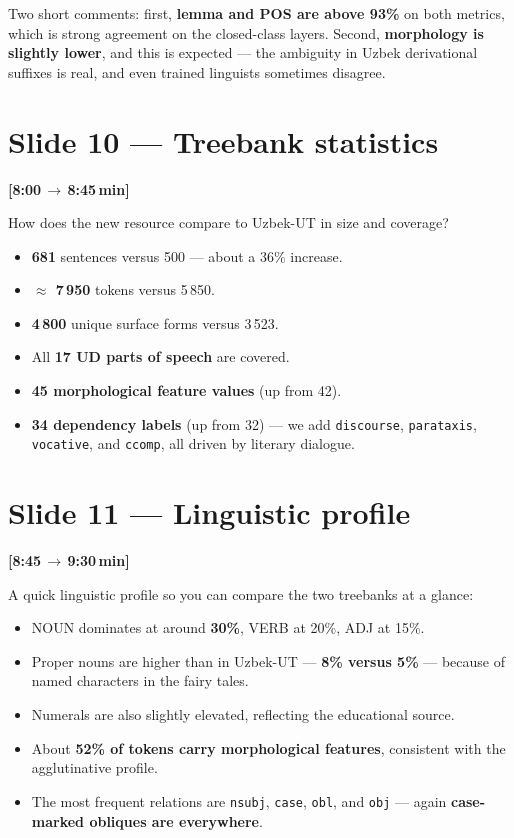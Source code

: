 \documentclass[12pt,a4paper]{article}
\newcommand{\timing}[2]{%
   \par\noindent\textbf{\small [#1\,$\to$\,#2\,min]}\par\vspace{0.2em}}
\newcommand{\say}[1]{\textbf{#1}}
\begin{document}
\noindent
Two short comments: first, \textbf{lemma and POS are above 93\%} on both
metrics, which is strong agreement on the closed-class layers. Second,
\textbf{morphology is slightly lower}, and this is expected — the
ambiguity in Uzbek derivational suffixes is real, and even trained
linguists sometimes disagree.

\section*{Slide 10 — Treebank statistics}
\timing{8:00}{8:45}

How does the new resource compare to Uzbek-UT in size and coverage?

\begin{itemize}
   \item \textbf{681} sentences versus 500 — about a 36\% increase.
   \item \textbf{$\approx$ 7\,950} tokens versus 5\,850.
   \item \textbf{4\,800} unique surface forms versus 3\,523.
   \item All \textbf{17 UD parts of speech} are covered.
   \item \textbf{45 morphological feature values} (up from 42).
   \item \textbf{34 dependency labels} (up from 32) — we add
         \texttt{discourse}, \texttt{parataxis}, \texttt{vocative}, and
         \texttt{ccomp}, all driven by literary dialogue.
\end{itemize}

\section*{Slide 11 — Linguistic profile}
\timing{8:45}{9:30}

A quick linguistic profile so you can compare the two treebanks at a
glance:

\begin{itemize}
   \item NOUN dominates at around \textbf{30\%}, VERB at 20\%, ADJ at 15\%.
   \item Proper nouns are higher than in Uzbek-UT — \textbf{8\% versus 5\%} — because of named characters in the fairy tales.
   \item Numerals are also slightly elevated, reflecting the educational source.
   \item About \textbf{52\% of tokens carry morphological features}, consistent with the agglutinative profile.
   \item The most frequent relations are \texttt{nsubj}, \texttt{case},
         \texttt{obl}, and \texttt{obj} — again \say{case-marked obliques are everywhere}.
\end{itemize}
\end{document}

